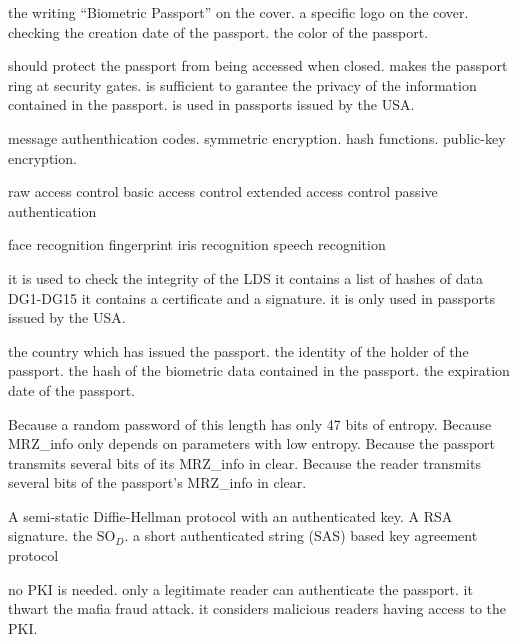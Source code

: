 {the writing ``Biometric Passport'' on the cover.}
{a specific logo on the cover.}
{checking the creation date of the passport.}
{the color of the passport.}

{should protect the passport from being accessed when closed.}
{makes the passport ring at security gates.}
{is sufficient to garantee the privacy of the information contained in the passport.}
{is used in passports issued by the USA.}

{message authenthication codes.}
{symmetric encryption.}
{hash functions.}
{public-key encryption.}

{raw access control}
{basic access control}
{extended access control}
{passive authentication}

{face recognition}
{fingerprint}
{iris recognition}
{speech recognition}

{it is used to check the integrity of the LDS}
{it contains a list of hashes of data DG1-DG15}
{it contains a certificate and a signature.}
{it is only used in passports issued by the USA.}

{the country which has issued the passport.}
{the identity of the holder of the passport.}
{the hash of the biometric data contained in the passport.}
{the expiration date of the passport.}

{Because a random password of this length has only 47 bits of entropy.}
{Because MRZ\_info only depends on parameters with low entropy.}
{Because the passport transmits several bits of its MRZ\_info in clear.}
{Because the reader transmits several bits of the passport's MRZ\_info in clear.}

{A semi-static Diffie-Hellman protocol with an authenticated key.}
{A RSA signature.}
{the SO$_D$.}
{a short authenticated string (SAS) based key agreement protocol}

{no PKI is needed.}
{only a legitimate reader can authenticate the passport.}
{it thwart the mafia fraud attack.}
{it considers malicious readers having access to the PKI.}